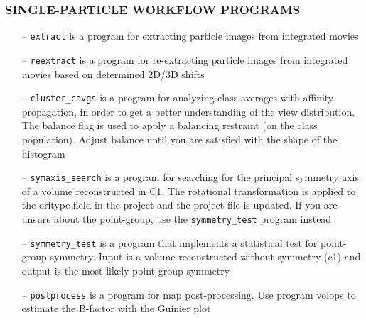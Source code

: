 \documentclass[a4paper,11pt]{article}
\newcommand{\prgname}[1]{\textcolor{NavyBlue}{\texttt{#1}}}
\begin{document}
\subsubsection{SINGLE-PARTICLE WORKFLOW PROGRAMS}
\begin{itemize}
\item[--] \prgname{extract} is a program for extracting particle images from integrated movies
\item[--] \prgname{reextract} is a program for re-extracting particle images from integrated movies based on determined 2D/3D shifts
\item[--] \prgname{cluster\_cavgs} is a program for analyzing class averages with affinity propagation, in order to get a better understanding of the view distribution. The balance flag is used to apply a balancing restraint (on the class population). Adjust balance until you are satisfied with the shape of the histogram
\item[--] \prgname{symaxis\_search} is a program for searching for the principal symmetry axis of a volume reconstructed in C1. The rotational transformation is applied to the oritype field in the project and the project file is updated. If you are unsure about the point-group, use the \prgname{symmetry\_test} program instead
\item[--] \prgname{symmetry\_test} is a program that implements a statistical test for point-group symmetry. Input is a volume reconstructed without symmetry (c1) and output is the most likely point-group symmetry
\item[--] \prgname{postprocess} is a program for map post-processing. Use program volops to estimate the B-factor with the Guinier plot
\end{itemize}
\end{document}
